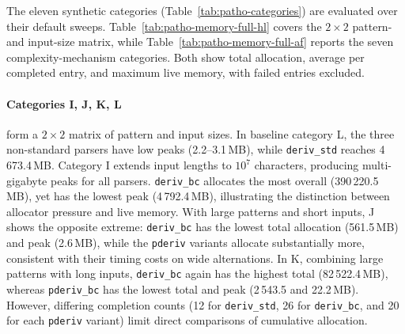 The eleven synthetic categories
(Table~\ref{tab:patho-categories})
are evaluated over their default sweeps.
Table~\ref{tab:patho-memory-full-hl}
covers the $2\times2$ pattern- and input-size matrix,
while Table~\ref{tab:patho-memory-full-af}
reports the seven complexity-mechanism categories.
Both show total allocation,
average per completed entry, and maximum live memory,
with failed entries excluded.

%

\paragraph{Categories I, J, K, L}
form a $2\times2$ matrix of pattern and input sizes.
In baseline category L, the three non-standard parsers
have low peaks (2.2--3.1\,MB), while
\texttt{deriv\_std} reaches 4\,673.4\,MB.
Category I extends input lengths to $10^7$ characters,
producing multi-gigabyte peaks for all parsers.
\texttt{deriv\_bc} allocates the most overall
(390\,220.5\,MB), yet has the lowest peak
(4\,792.4\,MB), illustrating the distinction
between allocator pressure and live memory.
With large patterns and short inputs, J shows
the opposite extreme: \texttt{deriv\_bc}
has the lowest total allocation (561.5\,MB)
and peak (2.6\,MB), while the \texttt{pderiv}
variants allocate substantially more,
consistent with their timing costs on wide alternations.
In K, combining large patterns with long inputs,
\texttt{deriv\_bc} again has the highest total
(82\,522.4\,MB), whereas \texttt{pderiv\_bc}
has the lowest total and peak
(2\,543.5 and 22.2\,MB).
However, differing completion counts
(12 for \texttt{deriv\_std}, 26 for \texttt{deriv\_bc},
and 20 for each \texttt{pderiv} variant)
limit direct comparisons of cumulative allocation.

%
%
%

